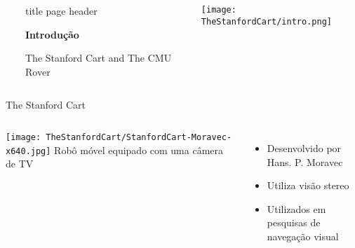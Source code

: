 \begin{frame}
    \begin{columns}
        ~\hfill
            \begin{beamercolorbox}[sep=8em, colsep*=18pt, wd=\textwidth,ht=\paperheight]{title page header}
                \begin{center}
                    \textbf{\huge{Introdução}}\par
                    \vspace*{0.3cm}
                    \vspace*{0.3cm}
                    The Stanford Cart and The CMU Rover
                \end{center}
            \end{beamercolorbox}%
        \begin{center}
            \texttt{[image: TheStanfordCart/intro.png]}
        \end{center}
            
    \end{columns}
  
 \end{frame}
\begin{frame}[t]{The Stanford Cart}
    \begin{columns}
        \texttt{[image: TheStanfordCart/StanfordCart-Moravec-x640.jpg]}
            Robô móvel equipado com uma câmera de TV
            \begin{itemize} 
                \item Desenvolvido por Hans. P. Moravec
                \item Utiliza visão stereo
                \item Utilizados em pesquisas de navegação visual
            \end{itemize}
            \end{columns}
\end{frame}

